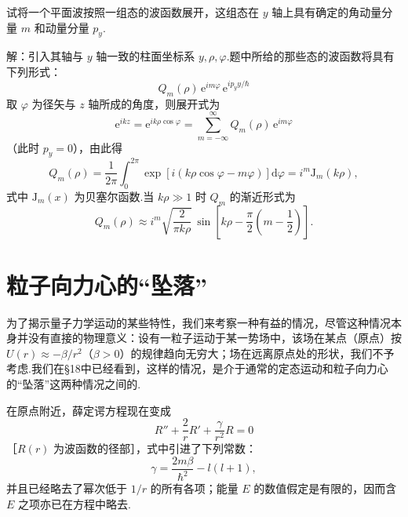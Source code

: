 \begin{xiti}

\quad 试将一个平面波按照一组态的波函数展开，这组态在 $y$ 轴上具有确定的角动量分量 $m$ 和动量分量 $p_y$.

解：引入其轴与 $y$ 轴一致的柱面坐标系 $y,\rho,\varphi$.题中所给的那些态的波函数将具有下列形式：
\begin{equation*}
  Q_m(\rho)\,\mathrm{e}^{im\varphi}\,\mathrm{e}^{ip_yy/\hbar}
\end{equation*}
取 $\varphi$ 为径矢与 $z$ 轴所成的角度，则展开式为
\begin{equation*}
  \mathrm{e}^{ikz}=\mathrm{e}^{ik\rho\cos\varphi}
  =\sum_{m=-\infty}^{\infty}Q_m(\rho)\,\mathrm{e}^{im\varphi}
\end{equation*}
（此时 $p_y=0$），由此得
\begin{equation*}
  Q_m(\rho)=\frac{1}{2\pi}\int_0^{2\pi}
  \exp\left[i(k\rho\cos\varphi-m\varphi)\right]\mathrm{d}\varphi
  =i^m\mathrm{J}_m(k\rho),
\end{equation*}
式中 $\mathrm{J}_m(x)$ 为贝塞尔函数.当 $k\rho\gg1$ 时 $Q_m$ 的渐近形式为
\begin{equation*}
  Q_m(\rho)\approx i^m\sqrt{\frac{2}{\pi k\rho}}\,
  \sin\left[k\rho-\frac{\pi}{2}\left(m-\frac{1}{2}\right)\right].
\end{equation*}

\end{xiti}

\section{粒子向力心的“坠落”}

为了揭示量子力学运动的某些特性，我们来考察一种有益的情况，尽管这种情况本身并没有直接的物理意义：设有一粒子运动于某一势场中，该场在某点（原点）按 $U(r)\approx-\beta/r^2$（$\beta>0$）的规律趋向无穷大；场在远离原点处的形状，我们不予考虑.我们在§18中已经看到，这样的情况，是介于通常的定态运动和粒子向力心的“坠落”这两种情况之间的.

在原点附近，薛定谔方程现在变成
\begin{equation}
  R''+\frac{2}{r}R'+\frac{\gamma}{r^2}R=0
\end{equation}
［$R(r)$ 为波函数的径部］，式中引进了下列常数：
\begin{equation}
  \gamma=\frac{2m\beta}{\hbar^2}-l(l+1),
\end{equation}
并且已经略去了幂次低于 $1/r$ 的所有各项；能量 $E$ 的数值假定是有限的，因而含 $E$ 之项亦已在方程中略去.

